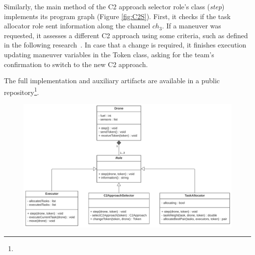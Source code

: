 Similarly, the main method of the C2 approach selector role's class (\textit{step}) implements its program graph (Figure \ref{fig:C2S}). First, it checks if the task allocator role sent information along the channel $ch_3$. If a maneuver was requested, it assesses a different C2 approach using some criteria, such as defined in the following research~\cite{france2014}. In case that a change is required, it finishes execution updating maneuver variables in the Token class, asking for the team's confirmation to switch to the new C2 approach.

The full implementation and auxiliary artifacts are available in a public repository\footnote{\gitRepository}.

\begin{figure}[ht]
  \centering
  \includegraphics[width=0.9\linewidth]{figures/diagramaDeClasse.png}
  \label{fig:ClassDiagram}
\end{figure}





